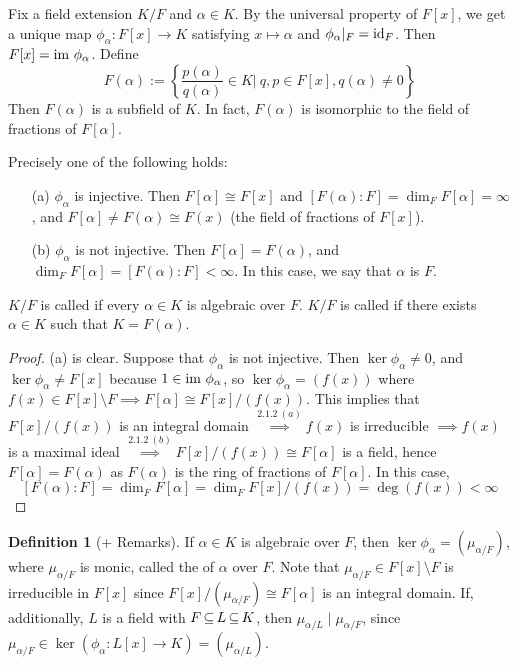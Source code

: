 \documentclass[11pt]{book}
\theoremstyle{definition}   \newtheorem{defn}[counter]{Definition} %
\newcommand{\bs}{\setminus}   \newcommand{\A}{\mathcal{A}}   \newcommand{\sy}{\textnormal{Syl}}   \newcommand{\size}[1]{\left| #1 \right|}
\DeclareMathOperator{\ra}{\rightarrow}   \DeclareMathOperator{\Poly}{\mathbf{P}}   \DeclareMathOperator{\spn}{\textnormal{span}}   \DeclareMathOperator{\aut}{\textnormal{Aut}}
\newcommand{\vs}{\vspace{8pt}}   \newcommand{\hs}{\hspace{8pt}}
\numberwithin{counter}{chapter}
\begin{document}
\vs

Fix a field extension $K/F$ and $\alpha \in K$. By the universal property of $F[x]$, we get a unique map $\phi_\alpha : F[x] \ra K$ satisfying $x \mapsto \alpha$ and $\phi_\alpha |_F = \textnormal{id}_F$. Then $F[x] = \textnormal{im } \phi_\alpha$. Define
	\[F(\alpha) := \left\{\frac{p(\alpha)}{q(\alpha)} \in K  \bigg| \ q,p \in F[x], q(\alpha) \ne 0 \right\} \]
Then $F(\alpha)$ is a subfield of $K$. In fact, $F(\alpha)$ is isomorphic to the field of fractions of $F[\alpha]$.

\vs

\begin{lemma}[+ Definition]
Precisely one of the following holds:
\begin{enumerate}
\item[(a)] $\phi_\alpha$ is injective. Then $F[\alpha] \cong F[x]$ and $[F(\alpha) : F] = \dim_F F[\alpha] = \infty$, and $F[\alpha] \ne F(\alpha) \cong F(x)$ (the field of fractions of $F[x]$).
\item[(b)] $\phi_\alpha$ is not injective. Then $F[\alpha] = F(\alpha)$, and $\dim_F F[\alpha] = [F(\alpha) : F] < \infty$. In this case, we say that $\alpha$ is  $F$. 
\end{enumerate}

$K/F$ is called  if every $\alpha \in K$ is algebraic over $F$. $K/F$ is called  if there exists $\alpha \in K$ such that $K = F(\alpha)$. 
\end{lemma}

\begin{proof}
(a) is clear. Suppose that $\phi_\alpha$ is not injective. Then $\ker \phi_\alpha \ne 0$, and $\ker \phi_\alpha \ne F[x]$ because $1 \in \textnormal{im } \phi_\alpha$, so $\ker \phi_\alpha = (f(x))$ where $f(x) \in F[x]\bs F \implies F[\alpha] \cong F[x]/(f(x))$. This implies that $F[x]/(f(x))$ is an integral domain $\overset{2.1.2 \ (a)}{\implies} f(x)$ is irreducible $ \implies f(x)$ is a maximal ideal $\overset{2.1.2 \ (b)}{\implies} F[x]/(f(x)) \cong F[\alpha]$ is a field, hence $F[\alpha] = F(\alpha)$ as $F(\alpha)$ is the ring of fractions of $F[\alpha]$. In this case, 
	\[[F(\alpha) : F] = \dim_F F[\alpha] = \dim_F F[x]/(f(x)) = \deg(f(x)) < \infty \]
\end{proof}

\vs

\begin{defn}[+ Remarks]
If $\alpha \in K$ is algebraic over $F$, then $\ker \phi_\alpha = (\mu_{\alpha/F})$, where $\mu_{\alpha/F}$ is monic, called the  of $\alpha$ over $F$. Note that $\mu_{\alpha/F} \in F[x]\bs F$ is irreducible in $F[x]$ since $F[x]/(\mu_{\alpha/F}) \cong F[\alpha]$ is an integral domain. If, additionally, $L$ is a field with $F \operatorname{\subseteq} L \operatorname{\subseteq} K$, then $\mu_{\alpha/L} \mid \mu_{\alpha/F}$, since $\mu_{\alpha/F} \in \ker(\phi_\alpha : L[x] \ra K) = (\mu_{\alpha/L})$. 
\end{defn}
\end{document}
